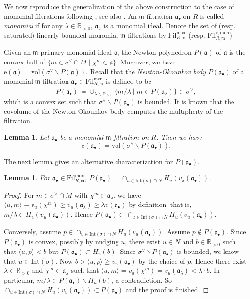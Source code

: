 \documentclass[11pt, leqno]{amsart}%
\theoremstyle{plain}
\newtheorem{lemma}[theorem]{Lemma}
\theoremstyle{definition}
\theoremstyle{remark}
\newcommand{\bR}{\mathbb{R}}
\newcommand{\fa}{\mathfrak{a}}
\newcommand{\fm}{\mathfrak{m}}
\newcommand{\vol}{\mathrm{vol}}
\newcommand{\Int}{\mathrm{Int}}
\newcommand{\e}{\mathrm{e}}
\newcommand{\Fil}{\mathrm{Fil}}
\numberwithin{equation}{section}
\begin{document}
We now reproduce the generalization of the above construction to the case of monomial filtrations following \cite{KK14}, see also \cite{Mus02}. An $\fm$-filtration $\fa_\bullet$ on $R$ is called \emph{monomial} if for any $\lambda\in\bR_{>0}$, $\fa_\lambda$ is a monomial ideal. Denote the set of (resp. saturated) linearly bounded monomial $\fm$-filtrations by $\Fil^\mathrm{mon}_{R,\fm}$ (resp. $\Fil^{s,\mathrm{mon}}_{R,\fm}$).

Given an $\fm$-primary monomial ideal $\fa$, the Newton polyhedron $P(\fa)$ of $\fa$ is the convex hull of $\{m\in\sigma^\vee\cap M\mid \chi^m\in\fa\}$. Moreover, we have $\e(\fa)=\vol(\sigma^\vee\backslash P(\fa))$. Recall that the \emph{Newton-Okounkov body} $P(\fa_\bullet)$ of a monomial $\fm$-filtration $\fa_\bullet\in\Fil^\mathrm{mon}_{R,\fm}$ is defined to be
\[
    P(\fa_\bullet)\coloneqq\overline{\cup_{\lambda\in\bR_{>0}}\{m/\lambda\mid m\in P(\fa_\lambda)\}}\subset\sigma^\vee,
\]
which is a convex set such that $\sigma^\vee\backslash P(\fa_\bullet)$ is bounded. It is known that the covolume of the Newton-Okounkov body computes the multiplicity of the filtration.

\begin{lemma}\cite[Theorem 6.5]{KK14}\label{lem:vol covol}
    Let $\fa_\bullet$ be a monomial $\fm$-filtration on $R$. Then we have 
    \[
    \e(\fa_\bullet)=\vol(\sigma^\vee\backslash P(\fa_\bullet)).
    \]
\end{lemma}

The next lemma gives an alternative characterization for $P(\fa_\bullet)$. 

\begin{lemma}\label{lem:toric Okounkov}
    For $\fa_\bullet\in\Fil^{\mathrm{mon}}_{R,\fm}$, $P(\fa_\bullet)=\cap_{u\in\Int(\sigma)\cap N} H_u(v_u(\fa_\bullet))$.
\end{lemma}

\begin{proof}
    For $m\in\sigma^\vee\cap M$ with $\chi^m\in\fa_\lambda$, we have $\langle u,m \rangle=v_u(\chi^m)\ge v_u(\fa_\lambda)\ge \lambda v(\fa_\bullet)$ by definition, that is, $m/\lambda\in H_u(v_u(\fa_\bullet))$. Hence $P(\fa_\bullet)\subset \cap_{u\in\Int(\sigma)\cap N} H_u(v_u(\fa_\bullet))$.

    Conversely, assume $p\in \cap_{u\in\Int(\sigma)\cap N} H_u(v_u(\fa_\bullet))$. Assume $p\notin P(\fa_\bullet)$. Since $P(\fa_\bullet)$ is convex, possibly by nudging $u$, there exist $u\in N$ and $b\in\bR_{>0}$ such that $\langle u,p \rangle<b$ but $P(\fa_\bullet)\subset H_u(b)$. Since $\sigma^\vee\backslash P(\fa_\bullet)$ is bounded, we know that $u\in \Int(\sigma)$. Now $b>\langle u,p\rangle \ge v_u(\fa_\bullet)$ by the choice of $p$. Hence there exist $\lambda\in\bR_{>0}$ and $\chi^m\in\fa_\lambda$ such that $\langle u,m \rangle=v_u(\chi^m)=v_u(\fa_\lambda)<\lambda\cdot b$. In particular, $m/\lambda\in P(\fa_\bullet)\backslash H_u(b)$, a contradiction. So $\cap_{u\in\Int(\sigma)\cap N}H_u(v_u(\fa_\bullet))\subset P(\fa_\bullet)$ and the proof is finished.
\end{proof}
\end{document}
